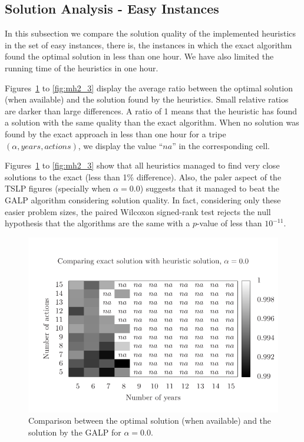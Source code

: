 \subsection{Solution Analysis - Easy Instances}

In this subsection we compare the solution quality of the implemented heuristics
in the set of easy instances, there is, the instances in which the exact algorithm
found the optimal solution in less than one hour. We have also limited the running time
of the heuristics in one hour.

Figures~\ref{fig:mh1_1} to \ref{fig:mh2_3} display the average ratio between the optimal solution (when available) 
and the solution found by the heuristics. 
Small relative ratios are darker than large differences.
A ratio of 1 means that the heuristic has found a solution with the same quality
than the exact algorithm.
When no solution was found by the exact approach in less than one hour for 
a tripe $(\alpha, years, actions)$, we display the value ``$na$'' in
the corresponding cell.

Figures~\ref{fig:mh1_1} to \ref{fig:mh2_3} show that all heuristics managed
to find very close solutions to the exact (less than 1\% difference).
Also, the paler aspect of the TSLP figures (specially when $\alpha=0.0$) suggests that
it managed to beat the GALP algorithm considering solution quality.
In fact, considering only these easier problem sizes, the paired Wilcoxon signed-rank test \cite{japkowicz2011evaluating} rejects the null hypothesis
that the algorithms are the same with a $p$-value of less than $10^{-11}$.

\begin{figure}
\centering
\includegraphics[scale=0.5, trim=0.75cm 0cm 0 2cm, clip=true]{imgs/comp_very_hard.pdf}
\caption{Comparison between the optimal solution (when available) 
and the solution by the GALP for $\alpha=0.0$.}
\label{fig:mh1_1}
\end{figure}

